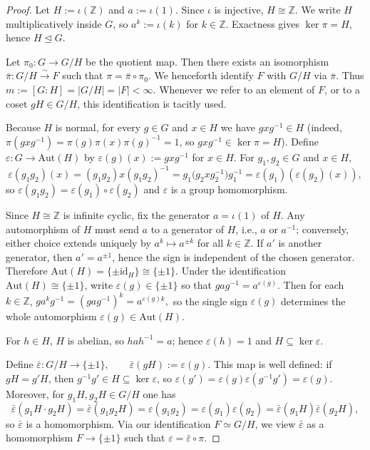 \documentclass[12pt,oneside,a4paper]{article}
\theoremstyle{mytheorem}
\theoremstyle{remark}
\theoremstyle{definition}
\begin{document}
\begin{proof}

Let $H:=\iota(\mathbb Z)$ and $a:=\iota(1)$. Since $\iota$ is injective, $H\cong\mathbb Z$. We write $H$ multiplicatively inside $G$, so $a^k:=\iota(k)$ for $k\in\mathbb Z$. Exactness gives $\ker\pi=H$, hence $H\trianglelefteq G$.

Let $\pi_0\colon G\to G/H$ be the quotient map. Then there exists an
isomorphism $\bar\pi\colon G/H\xrightarrow{\;\sim\;}F$ such that
$\pi=\bar\pi\circ\pi_0$.
We henceforth identify $F$ with $G/H$ via $\bar\pi$. Thus
$m:=[G:H]=|G/H|=|F|<\infty.$ Whenever we refer to an element of $F$, or
to a coset $gH\in G/H$, this identification is tacitly used.

Because $H$ is normal, for every $g\in G$ and $x\in H$ we have $gxg^{-1}\in H$ (indeed, $\pi(gxg^{-1})=\pi(g)\pi(x)\pi(g)^{-1}=1$, so $gxg^{-1}\in\ker\pi=H$). Define
$\varepsilon\colon G\to \mathrm{Aut}(H)$ by
$\varepsilon(g)(x):=gxg^{-1}$ for $x\in H$. For $g_1,g_2\in G$ and $x\in H$,
\[
\varepsilon(g_1g_2)(x)
=(g_1g_2)x(g_1g_2)^{-1}
=g_1\big(g_2xg_2^{-1}\big)g_1^{-1}
=\varepsilon(g_1)\!\left(\varepsilon(g_2)(x)\right),
\]
so $\varepsilon(g_1g_2)=\varepsilon(g_1)\circ\varepsilon(g_2)$ and $\varepsilon$ is a group homomorphism.

Since $H\cong\mathbb Z$ is infinite cyclic, fix the generator $a=\iota(1)$ of $H$. Any automorphism of $H$ must send $a$ to a generator of $H$, i.e., $a$ or $a^{-1}$; conversely, either choice extends uniquely by $a^k\mapsto a^{\pm k}$ for all $k\in\mathbb Z$. If $a'$ is another generator, then $a'=a^{\pm1}$, hence the sign is independent of the chosen generator. Therefore $\mathrm{Aut}(H)=\{\pm\mathrm{id}_H\}\cong\{\pm1\}.$ Under the identification $\mathrm{Aut}(H)\cong\{\pm1\}$, write $\varepsilon(g)\in\{\pm1\}$ so that $gag^{-1}=a^{\varepsilon(g)}$. Then for each $k\in\mathbb Z$, $ga^kg^{-1}=(gag^{-1})^k=a^{\varepsilon(g)k},$ so the single sign $\varepsilon(g)$ determines the whole automorphism $\varepsilon(g)\in\mathrm{Aut}(H)$.

For $h\in H$, $H$ is abelian, so $hah^{-1}=a$; hence $\varepsilon(h)=1$ and $H\subseteq\ker\varepsilon$.

 Define
 $\bar\varepsilon:G/H\to \{\pm1\},\qquad \bar\varepsilon(gH):=\varepsilon(g).$
This map is well defined: if
$gH=g'H$, then $g^{-1}g'\in H\subseteq\ker\varepsilon$, so
$\varepsilon(g')=\varepsilon(g)\varepsilon(g^{-1}g')=\varepsilon(g)$. Moreover, for $g_1H,g_2H\in G/H$ one has
\[
\bar\varepsilon(g_1H\cdot g_2H)
=\bar\varepsilon(g_1g_2H)
=\varepsilon(g_1g_2)
=\varepsilon(g_1)\varepsilon(g_2)
=\bar\varepsilon(g_1H)\bar\varepsilon(g_2H),
\]
so $\bar\varepsilon$ is a homomorphism. Via our identification $F\simeq G/H$, we view $\bar\varepsilon$ as a homomorphism $F\to\{\pm1\}$ such that
$\varepsilon=\bar\varepsilon\circ\pi.$



\end{proof}
\end{document}
